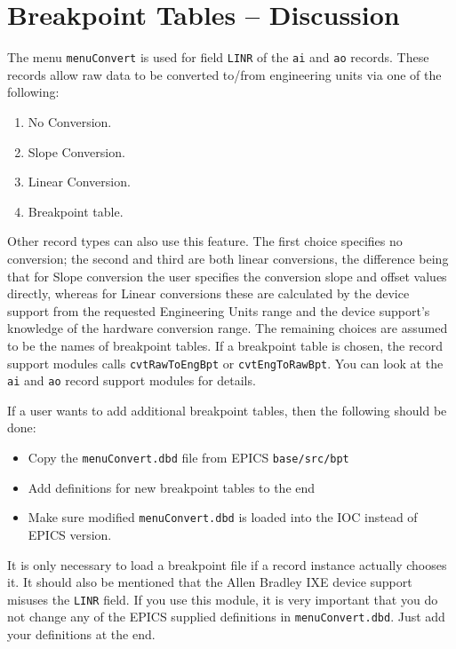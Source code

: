 \section{Breakpoint Tables -- Discussion}

The menu \verb|menuConvert| is used for field \verb|LINR| of the \verb|ai| and \verb|ao| records.
These records allow raw data to be converted to/from engineering units via one of the following:

\begin{enumerate}
\item No Conversion.
\item {}Slope Conversion.
\item {}Linear Conversion.
\item Breakpoint table.
\end{enumerate}

Other record types can also use this feature.
The first choice specifies no conversion; the second and third are both linear conversions, the difference being that for Slope conversion the user specifies the conversion slope and offset values directly, whereas for Linear conversions these are calculated by the device support from the requested Engineering Units range and the device support's knowledge of the hardware conversion range.
The remaining choices are assumed to be the names of breakpoint tables.
If a breakpoint table is chosen, the record support modules calls \verb|cvtRawToEngBpt| or \verb|cvtEngToRawBpt|.
You can look at the \verb|ai| and \verb|ao| record support modules for details.

If a user wants to add additional breakpoint tables, then the following should be done:

\begin{itemize}
\item Copy the \verb|menuConvert.dbd| file from EPICS \verb|base/src/bpt|
\item Add definitions for new breakpoint tables to the end
\item Make sure modified \verb|menuConvert.dbd| is loaded  into the IOC instead of EPICS version.
\end{itemize}

It is only necessary to load a breakpoint file if a record instance actually chooses it.
It should also be mentioned that the Allen Bradley IXE device support misuses the \verb|LINR| field.
If you use this module, it is very important that you do not change any of the EPICS supplied definitions in \verb|menuConvert.dbd|.
Just add your definitions at the end.


